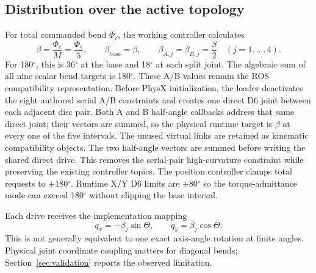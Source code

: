 \documentclass[11pt,letterpaper]{article}
\newcommand{\degrees}{\ensuremath{^{\circ}}}
\begin{document}
\subsection{Distribution over the active topology}
For total commanded bend $\Phi_c$, the working controller calculates
\begin{equation}
\beta=\frac{\Phi_c}{M}=\frac{\Phi_c}{5},\qquad
\beta_{\mathrm{base}}=\beta,\qquad
\beta_{A,j}=\beta_{B,j}=\frac{\beta}{2}\quad(j=1,\ldots,4).
\end{equation}
For 180\degrees{}, this is 36\degrees{} at the base and 18\degrees{} at each
split joint. The algebraic sum of all nine scalar bend targets is 180\degrees{}.
These A/B values remain the ROS compatibility representation. Before PhysX
initialization, the loader deactivates the eight authored serial A/B constraints
and creates one direct D6 joint between each adjacent disc pair. Both A and B
half-angle callbacks address that same direct joint; their vectors are summed,
so the physical runtime target is $\beta$ at every one of the five intervals.
The unused virtual links are retained as kinematic compatibility objects. The
two half-angle vectors are summed before writing the shared direct
drive. This removes the serial-pair high-curvature constraint while preserving
the existing controller topics.
The position controller clamps total requests to $\pm180$\degrees{}. Runtime
X/Y D6 limits are $\pm80$\degrees{} so the torque-admittance mode can exceed
180\degrees{} without clipping the base interval.

Each drive receives the implementation mapping
\begin{equation}
q_x=-\beta_j\sin\Theta,\qquad q_y=\beta_j\cos\Theta.
\label{eq:drive}
\end{equation}
This is not generally equivalent to one exact axis-angle rotation at finite
angles. Physical joint coordinate coupling matters for diagonal bends;
Section~\ref{sec:validation} reports the observed limitation.
\end{document}
